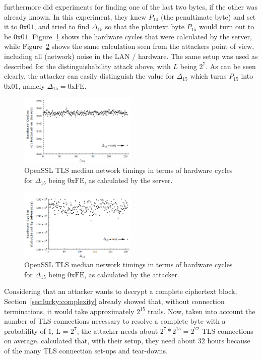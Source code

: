 \documentclass[10pt,conference,a4paper]{IEEEtran}
\begin{document}
\citeauthor{alfardan2013lucky} furthermore did experiments for finding one of the last two bytes, if the other was already known. In this experiment, they knew $P_{14}$ (the penultimate byte) and set it to $0\text{x}01$, and tried to find $\Delta_{15}$ so that the plaintext byte $P_{15}$ would turn out to be $0\text{x}01$. Figure~\ref{fig:luckybyteserver} shows the hardware cycles that were calculated by the server, while Figure~\ref{fig:luckybyteattacker} shows the same calculation seen from the attackers point of view, including all (network) noise in the LAN / hardware. The same setup was used as described for the distinguishability attack above, with $L$ being $2^7$. As can be seen clearly, the attacker can easily distinguish the value for $\Delta_{15}$ which turns $P_{15}$ into $0\text{x}01$, namely $\Delta_{15} = 0\text{xFE}$.

\begin{figure}[h]
	\centering
	\includegraphics[width=0.5\textwidth]{lucky_byte_server.png}
	\caption{OpenSSL TLS median network timings in terms of hardware cycles for $\Delta_{15}$ being $0\text{xFE}$, as calculated by the server.~\cite{alfardan2013lucky}}
	\label{fig:luckybyteserver}
\end{figure}

\begin{figure}[h]
	\centering
	\includegraphics[width=0.5\textwidth]{lucky_byte_attacker.png}
	\caption{OpenSSL TLS median network timings in terms of hardware cycles for $\Delta_{15}$ being $0\text{xFE}$, as calculated by the attacker.~\cite{alfardan2013lucky}}
	\label{fig:luckybyteattacker}
\end{figure}

Considering that an attacker wants to decrypt a complete ciphertext block, Section~\ref{sec:lucky:complexity} already showed that, without connection terminations, it would take approximately $2^{15}$ trails. Now, taken into account the number of TLS connections necessary to resolve a complete byte with a probability of $1$, L = $2^7$, the attacker needs about $2^7*2^{15} = 2^{22}$ TLS connections on average. \citeauthor{alfardan2013lucky} calculated that, with their setup, they need about $32$ hours because of the many TLS connection set-ups and tear-downs.
\end{document}
